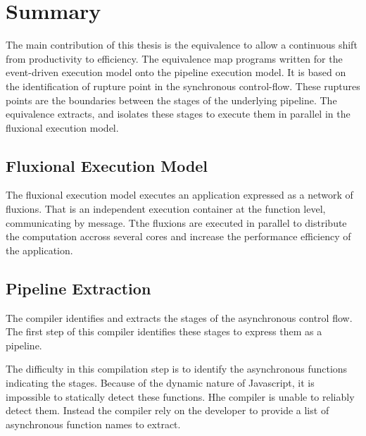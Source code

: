\section{Summary} \label{chapter6:summary}

The main contribution of this thesis is the equivalence to allow a continuous shift from productivity to efficiency.
The equivalence map programs written for the event-driven execution model onto the pipeline execution model.
It is based on the identification of rupture point in the synchronous control-flow.
These ruptures points are the boundaries between the stages of the underlying pipeline.
The equivalence extracts, and isolates these stages to execute them in parallel in the fluxional execution model.


\subsection{Fluxional Execution Model} \label{chapter7:conclusion:model}

The fluxional execution model executes an application expressed as a network of fluxions.
That is an independent execution container at the function level, communicating by message.
Tthe fluxions are executed in parallel to distribute the computation accross several cores and increase the performance efficiency of the application.

\subsection{Pipeline Extraction} \label{chapter7:conclusion:extraction}

The compiler identifies and extracts the stages of the asynchronous control flow.
The first step of this compiler identifies these stages to express them as a pipeline.

The difficulty in this compilation step is to identify the asynchronous functions indicating the stages.
Because of the dynamic nature of Javascript, it is impossible to statically detect these functions.
Hhe compiler is unable to reliably detect them.
Instead the compiler rely on the developer to provide a list of asynchronous function names to extract.

